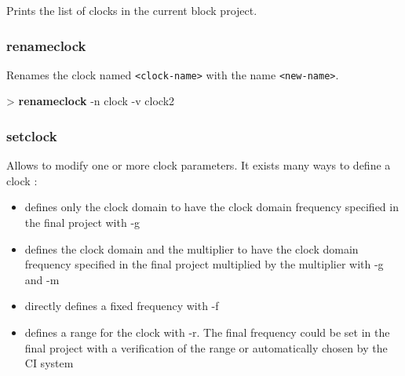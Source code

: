 \documentclass[10pt,a4paper]{article}
\begin{document}
Prints the list of clocks in the current block project.

\subsubsection{renameclock}
\label{subsec:renameclock}

Renames the clock named \texttt{<clock-name>} with the name \texttt{<new-name>}.\\


\begin{sampletitle}
> \textbf{\tool{} renameclock} -n clock -v clock2
\end{sampletitle}


\subsubsection{setclock}
\label{subsec:setclock}

Allows to modify one or more clock parameters. It exists many ways to define a clock :
\begin{itemize}
\item defines only the clock domain to have the clock domain frequency specified in the final project with -g
\item defines the clock domain and the multiplier to have the clock domain frequency specified in the final project multiplied by the multiplier with -g and -m
\item directly defines a fixed frequency with -f
\item defines a range for the clock with -r. The final frequency could be set in the final project with a verification of the range or automatically chosen by the CI system
\end{itemize}

\end{document}

